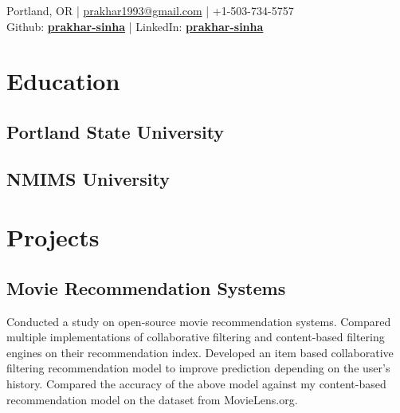 \documentclass[]{prakhar-resume-version-2}
\begin{document}
%
%
 { Portland, OR |
\href{mailto:prakhar1993@gmail.com}{prakhar1993@gmail.com} | +1-503-734-5757 \\
Github: \href{https://github.com/prakhar-sinha}{\bf prakhar-sinha} |
LinkedIn: \href{https://www.linkedin.com/in/prakhar-sinha}{\bf prakhar-sinha} \\
}

%
%

\begin{minipage}[t]{0.33\textwidth} 


\section{Education} 

\subsection{Portland State University}
\sectionsep

\subsection{NMIMS University}
\sectionsep


\section{Projects}

\subsection{Movie Recommendation Systems}
\begin{justify}

 \footnotesize{Conducted a study on open-source movie recommendation systems. Compared multiple implementations of collaborative filtering and content-based filtering engines on their recommendation index. Developed an item based collaborative filtering recommendation model to improve prediction depending on the user’s history. Compared the accuracy of the above model against my content-based recommendation model on the dataset from MovieLens.org.}
\end{justify}
\sectionsep


\end{minipage}
\end{document}
